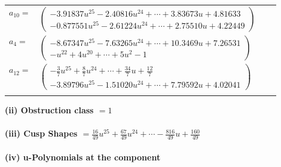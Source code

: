 \documentclass[1p]{elsarticle_modified}
\theoremstyle{definition}
\begin{document}
\begin{tabular}{m{7pt} m{180pt} m{7pt} m{180pt} }
\flushright $a_{10}=$&$\begin{pmatrix}-3.91837 u^{25}-2.40816 u^{24}+\cdots+3.83673 u+4.81633\\-0.877551 u^{25}-2.61224 u^{24}+\cdots+2.75510 u+4.22449\end{pmatrix}$ \\
\flushright $a_{4}=$&$\begin{pmatrix}-8.67347 u^{25}-7.63265 u^{24}+\cdots+10.3469 u+7.26531\\- u^{22}+4 u^{20}+\cdots+5 u^2-1\end{pmatrix}$ \\
\flushright $a_{12}=$&$\begin{pmatrix}-\frac{3}{7} u^{25}+\frac{8}{7} u^{24}+\cdots+\frac{34}{7} u+\frac{12}{7}\\-3.89796 u^{25}-1.51020 u^{24}+\cdots+7.79592 u+4.02041\end{pmatrix}$\\&\end{tabular}
\flushleft \textbf{(ii) Obstruction class $= 1$}\\~\\
\flushleft \textbf{(iii) Cusp Shapes $= \frac{16}{49} u^{25}+\frac{67}{49} u^{24}+\cdots-\frac{816}{49} u+\frac{160}{49}$}\\~\\
\newpage\renewcommand{\arraystretch}{1}
\flushleft \textbf{(iv) u-Polynomials at the component}\newline \\
\end{document}
